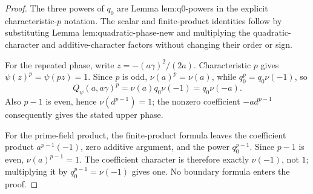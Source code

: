 \begin{proof}
The three powers of $q_0$ are Lemma lem:q0-powers in the explicit
characteristic-$p$ notation.  The scalar and finite-product identities
follow by substituting Lemma lem:quadratic-phase-new and multiplying the
quadratic-character and additive-character factors without changing
their order or sign.

For the repeated phase, write
$z=-(a\gamma)^2/(2a)$.  Characteristic $p$ gives
$\psi(z)^p=\psi(pz)=1$.  Since $p$ is odd,
$\nu(a)^p=\nu(a)$, while $q_0^p=q_0\nu(-1)$, so
\[
 Q_\psi(a,a\gamma)^p
 =\nu(a)q_0\nu(-1)=q_0\nu(-a).
\]
Also $p-1$ is even, hence $\nu(d^{p-1})=1$; the nonzero coefficient
$-ad^{p-1}$ consequently gives the stated upper phase.

For the prime-field product, the finite-product formula leaves the
coefficient product $a^{p-1}(-1)$, zero additive argument, and the
power $q_0^{p-1}$.  Since $p-1$ is even,
$\nu(a)^{p-1}=1$.  The coefficient character is therefore exactly
$\nu(-1)$, not $1$; multiplying it by
$q_0^{p-1}=\nu(-1)$ gives one.  No boundary formula enters the proof.
\end{proof}
